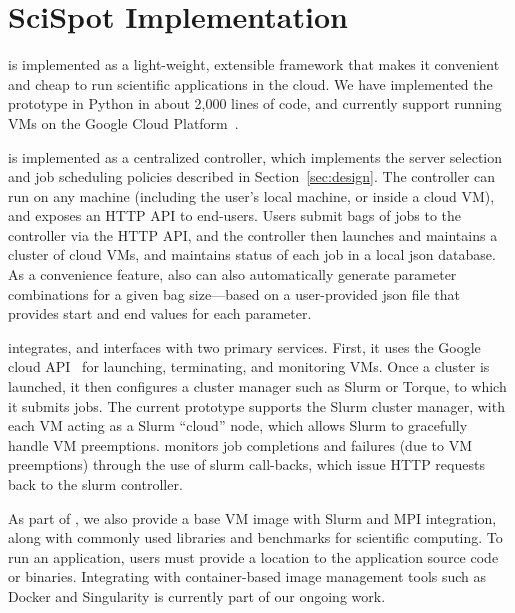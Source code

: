 \vspace*{\subsecspace}
\section{SciSpot Implementation}

\sysname is implemented as a light-weight, extensible framework that makes it convenient and cheap to run scientific applications in the cloud.
We have implemented the \sysname prototype in Python in about 2,000 lines of code, and currently support running VMs on the Google Cloud Platform~\cite{gcp}. 

\sysname is implemented as a centralized controller, which implements the server selection and job scheduling policies described in Section~\ref{sec:design}. 
The controller can run on any machine (including the user's local machine, or inside a cloud VM), and exposes an HTTP API to end-users. 
Users submit bags of jobs to the controller via the HTTP API, and the controller then launches and maintains a cluster of cloud VMs, and maintains status of each job in a local json database. 
As a convenience feature, \sysname also can also automatically generate parameter combinations for a given bag size---based on a user-provided json file that provides start and end values for each parameter. 



\sysname integrates, and interfaces with two primary services.
First, it uses the Google cloud API~\cite{gcloud-api} for launching, terminating, and monitoring VMs.
Once a cluster is launched, it then configures a cluster manager such as Slurm or Torque, to which it submits jobs. 
The current \sysname prototype supports the Slurm cluster manager, with each VM acting as a Slurm ``cloud'' node, which allows Slurm to gracefully handle VM preemptions. 
\sysname monitors job completions and failures (due to VM preemptions) through the use of slurm call-backs, which issue HTTP requests back to the slurm controller.

As part of \sysname, we also provide a base VM image with Slurm and MPI integration, along with commonly used libraries and benchmarks for scientific computing. To run an application, users must provide a location to the application source code or binaries. Integrating \sysname with container-based image management tools such as Docker and Singularity is currently part of our ongoing work. 





